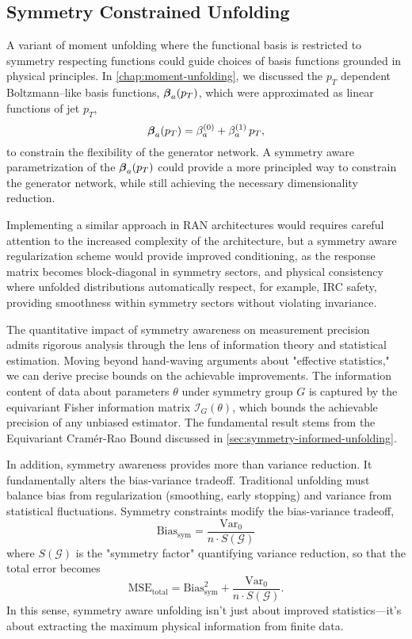     \subsection{Symmetry Constrained Unfolding}
        A variant of moment unfolding where the functional basis is restricted to symmetry respecting functions could guide choices of basis functions grounded in physical principles.
        In \cref{chap:moment-unfolding}, we discussed the \(p_T\) dependent Boltzmann--like basis functions, \(\vb*{\beta}_a(p_T)\), which were approximated as linear functions of jet \(p_T\),
        \[
            \vb*{\beta}_a(p_T) = {\beta}_a^{(0)} + {\beta}_a^{(1)}\,p_T,
        \]
        to constrain the flexibility of the generator network.
        A symmetry aware parametrization of the \(\vb*{\beta}_a(p_T)\) could provide a more principled way to constrain the generator network, while still achieving the necessary dimensionality reduction.
        
        Implementing a similar approach in RAN architectures would requires careful attention to the increased complexity of the architecture, but a symmetry aware regularization scheme would provide improved conditioning, as the response matrix becomes block-diagonal in symmetry sectors, and physical consistency where unfolded distributions automatically respect, for example, IRC safety, providing smoothness within symmetry sectors without violating invariance.

        The quantitative impact of symmetry awareness on measurement precision admits rigorous analysis through the lens of information theory and statistical estimation.
        Moving beyond hand-waving arguments about "effective statistics," we can derive precise bounds on the achievable improvements.
        The information content of data about parameters \(\theta\) under symmetry group \(G\) is captured by the equivariant Fisher information matrix \(\mathcal{I}_G(\theta)\), which bounds the achievable precision of any unbiased estimator.
        The fundamental result stems from the Equivariant Cramér-Rao Bound discussed in \cref{sec:symmetry-informed-unfolding}.
        
        In addition, symmetry awareness provides more than variance reduction.
        It fundamentally alters the bias-variance tradeoff.
        Traditional unfolding must balance bias from regularization (smoothing, early stopping) and variance from statistical fluctuations.
        Symmetry constraints modify the bias-variance tradeoff,
        \[
            \text{Bias}_{\text{sym}} = \frac{\text{Var}_0}{n \cdot S(\mathcal{G})}
        \]
        where \(S(\mathcal{G})\) is the "symmetry factor" quantifying variance reduction, so that the total error becomes
        \[
            \text{MSE}_{\text{total}} = \text{Bias}_{\text{sym}}^2 + \frac{\text{Var}_0}{n \cdot S(\mathcal{G})}.
        \]
        In this sense, symmetry aware unfolding isn't just about improved statistics---it's about extracting the maximum physical information from finite data.


